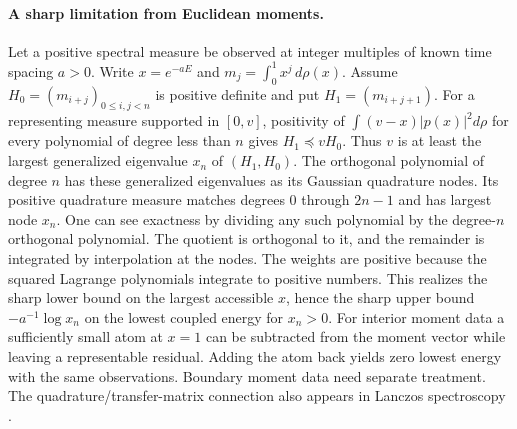 \documentclass[11pt,letterpaper]{article}
\begin{document}
\paragraph{A sharp limitation from Euclidean moments.}
Let a positive spectral measure be observed at integer multiples of known time spacing $a>0$. Write $x=e^{-aE}$ and $m_j=\int_0^1x^j\,d\rho(x)$. Assume $H_0=(m_{i+j})_{0\le i,j<n}$ is positive definite and put $H_1=(m_{i+j+1})$. For a representing measure supported in $[0,v]$, positivity of $\int(v-x)|p(x)|^2d\rho$ for every polynomial of degree less than $n$ gives $H_1\preceq vH_0$. Thus $v$ is at least the largest generalized eigenvalue $x_n$ of $(H_1,H_0)$. The orthogonal polynomial of degree $n$ has these generalized eigenvalues as its Gaussian quadrature nodes. Its positive quadrature measure matches degrees $0$ through $2n-1$ and has largest node $x_n$. One can see exactness by dividing any such polynomial by the degree-$n$ orthogonal polynomial. The quotient is orthogonal to it, and the remainder is integrated by interpolation at the nodes. The weights are positive because the squared Lagrange polynomials integrate to positive numbers. This realizes the sharp lower bound on the largest accessible $x$, hence the sharp upper bound $-a^{-1}\log x_n$ on the lowest coupled energy for $x_n>0$. For interior moment data a sufficiently small atom at $x=1$ can be subtracted from the moment vector while leaving a representable residual. Adding the atom back yields zero lowest energy with the same observations. Boundary moment data need separate treatment. The quadrature/transfer-matrix connection also appears in Lanczos spectroscopy \cite{wagman}.
\end{document}
